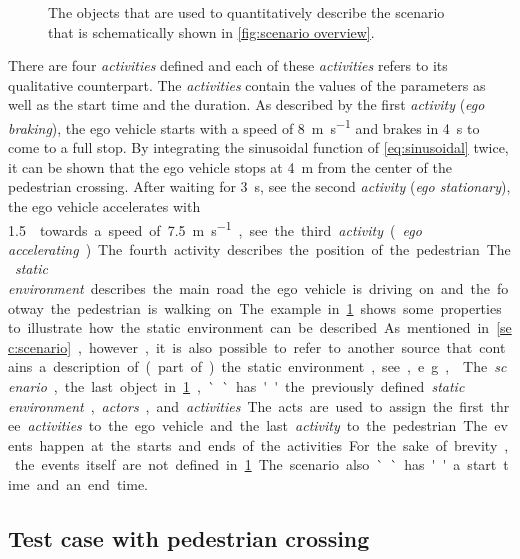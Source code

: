 \begin{figure}
	\centering
	
	\caption{ The objects that are used to quantitatively describe the scenario that is schematically shown in \cref{fig:scenario overview}. 
	}
	\label{fig:example quantitative}
\end{figure}


There are four \textit{activities} defined and each of these \textit{activities} refers to its qualitative counterpart. The \textit{activities} contain the values of the parameters as well as the start time and the duration. As described by the first \textit{activity} (\emph{ego braking}), the ego vehicle starts with a speed of \SI{8}{\meter\per\second} and brakes in \SI{4}{\second} to come to a full stop. By integrating the sinusoidal function of \cref{eq:sinusoidal} twice, it can be shown that the ego vehicle stops at \SI{4}{\meter} from the center of the pedestrian crossing. After waiting for \SI{3}{\second}, see the second \textit{activity} (\emph{ego stationary}), the ego vehicle accelerates with \SI{1.5}{\meter\per\second\square} towards a speed of \SI{7.5}{\meter\per\second}, see the third \textit{activity} (\emph{ego accelerating}). The fourth activity describes the position of the pedestrian.

The \textit{static environment} describes the main road the ego vehicle is driving on and the footway the pedestrian is walking on. The example in \cref{fig:example quantitative} shows some properties to illustrate how the static environment can be described. As mentioned in \cref{sec:scenario}, however, it is also possible to refer to another source that contains a description of (part of) the static environment, see, e.g., \autocite{dupuis2010opendrive}. 

The \textit{scenario}, the last object in \cref{fig:example quantitative}, ``has'' the previously defined \textit{static environment}, \textit{actors}, and \textit{activities}. The acts are used to assign the first three \textit{activities} to the ego vehicle and the last \textit{activity} to the pedestrian. The events happen at the starts and ends of the activities. For the sake of brevity, the events itself are not defined in \cref{fig:example quantitative}. The scenario also ``has'' a start time and an end time.

\subsection{Test case with pedestrian crossing}
\label{sec:example test case}


